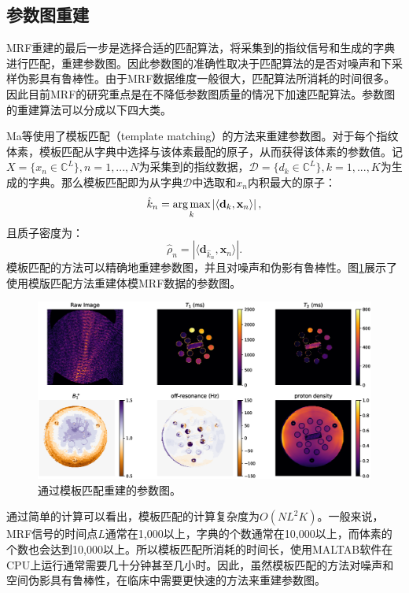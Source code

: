 \subsection{参数图重建}
MRF重建的最后一步是选择合适的匹配算法，将采集到的指纹信号和生成的字典进行匹配，重建参数图。因此参数图的准确性取决于匹配算法的是否对噪声和下采样伪影具有鲁棒性。由于MRF数据维度一般很大，匹配算法所消耗的时间很多。因此目前MRF的研究重点是在不降低参数图质量的情况下加速匹配算法。参数图的重建算法可以分成以下四大类。

Ma等\cite{mrf}使用了模板匹配（template matching）的方法来重建参数图。对于每个指纹体素，模板匹配从字典中选择与该体素最配的原子，从而获得该体素的参数值。记$X=\{x_n\in \mathbb{C}^L\}, n=1,...,N$为采集到的指纹数据，$\mathcal{D}=\{d_k\in \mathbb{C}^L\},k=1,...,K$为生成的字典。那么模板匹配即为从字典$\mathcal{D}$中选取和$x_n$内积最大的原子：
\begin{equation}
\hat{k}_n = \operatorname*{arg\,max}_k \left|\left\langle \mathbf{d}_k,\mathbf{x}_n \right\rangle \right|,
\end{equation}
且质子密度为：
\begin{equation}
\hat{\rho}_n=\left|\langle \mathbf{d}_{\hat{k}_n},\mathbf{x}_n \rangle\right|.
\end{equation}
模板匹配的方法可以精确地重建参数图，并且对噪声和伪影有鲁棒性。图\ref{fig:mrfmap}展示了使用模版匹配方法重建体模MRF数据的参数图。
\begin{figure}[htbp]
\centering
\includegraphics[width=1\textwidth]{img/intro/mrfmap.eps}
\caption{通过模板匹配重建的参数图。}
\label{fig:mrfmap}
\end{figure}
通过简单的计算可以看出，模板匹配的计算复杂度为$O(NL^2K)$。一般来说，MRF信号的时间点$L$通常在1,000以上，字典的个数通常在10,000以上，而体素的个数也会达到10,000以上。所以模板匹配所消耗的时间长，使用MALTAB软件在CPU上运行通常需要几十分钟甚至几小时。因此，虽然模板匹配的方法对噪声和空间伪影具有鲁棒性，在临床中需要更快速的方法来重建参数图。

